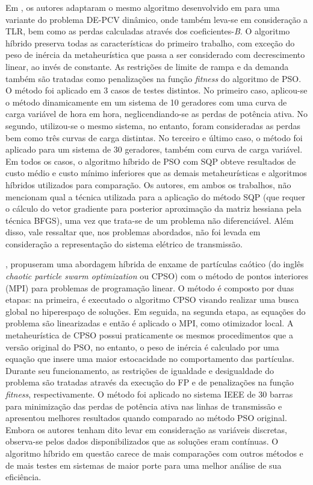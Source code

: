 \documentclass[
	12pt,				%
	openany,			%
	twoside,			%
	a4paper,			%
	chapter=TITLE,		%
	section=Title,		%
	subsection=Title,	%
	subsubsection=Title,%
	english,			%
	french,				%
	spanish,			%
	brazil			%
	]{abntex2}
\begin{document}
\begin{ERRATA}
Em , os autores adaptaram o mesmo algoritmo desenvolvido em \citeyear{PSO-SQP} para uma variante do problema DE-PCV dinâmico, onde também leva-se em consideração a TLR, bem como as perdas calculadas através dos coeficientes-\emph{B}. O algoritmo híbrido preserva todas as características do primeiro trabalho, com exceção do peso de inércia da metaheurística que passa a ser considerado com decrescimento linear, ao invés de constante. As restrições de limite de rampa e da demanda também são tratadas como penalizações na função \emph{fitness} do algoritmo de PSO. O método foi aplicado em 3 casos de testes distintos. No primeiro caso, aplicou-se o método dinamicamente em um sistema de 10 geradores com uma curva de carga variável de hora em hora, neglicendiando-se as perdas de potência ativa. No segundo, utilizou-se o mesmo sistema, no entanto, foram consideradas as perdas bem como três curvas de carga distintas. No terceiro e último caso, o método foi aplicado para um sistema de 30 geradores, também com curva de carga variável. Em todos os casos, o algoritmo híbrido de PSO com SQP obteve resultados de custo médio e custo mínimo inferiores que as demais metaheurísticas e algoritmos híbridos utilizados para comparação. Os autores, em ambos os trabalhos, não mencionam qual a técnica utilizada para a aplicação do método SQP (que requer o cálculo do vetor gradiente para posterior aproximação da matriz hessiana pela técnica BFGS), uma vez que trata-se de um problema não diferenciável. Além disso, vale ressaltar que, nos problemas abordados, não foi levada em consideração a representação do sistema elétrico de transmissão.

, propuseram uma abordagem híbrida de enxame de partículas caótico (do inglês \emph{chaotic particle swarm optimization} ou CPSO) com o método de pontos interiores (MPI) para problemas de programação linear. O método é composto por duas etapas: na primeira, é executado o algoritmo CPSO visando realizar uma busca global no hiperespaço de soluções. Em seguida, na segunda etapa, as equações do problema são linearizadas e então é aplicado o MPI, como otimizador local. A metaheurística de CPSO possui praticamente os mesmos procedimentos que a versão original do PSO, no entanto, o peso de inércia é calculado por uma equação que insere uma maior estocacidade no comportamento das partículas. Durante seu funcionamento, as restrições de igualdade e desigualdade do problema são tratadas através da execução do FP e de penalizações na função \emph{fitness}, respectivamente. O método foi aplicado no sistema IEEE de 30 barras para minimização das perdas de potência ativa nas linhas de transmissão e apresentou melhores resultados quando comparado ao método PSO original. Embora os autores tenham dito levar em consideração as variáveis discretas, observa-se pelos dados disponibilizados que as soluções eram contínuas. O algoritmo híbrido em questão carece de mais comparações com outros métodos e de mais testes em sistemas de maior porte para uma melhor análise de sua eficiência.


\end{ERRATA}
\end{document}
